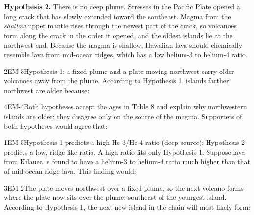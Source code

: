 \documentclass[11pt]{article}
\begin{document}
\textbf{Hypothesis 2.} There is no deep plume. Stresses in the Pacific Plate opened a long crack that has slowly extended toward the southeast. Magma from the \emph{shallow} upper mantle rises through the newest part of the crack, so volcanoes form along the crack in the order it opened, and the oldest islands lie at the northwest end. Because the magma is shallow, Hawaiian lava should chemically resemble lava from mid-ocean ridges, which has a low helium-3 to helium-4 ratio.
\passageend

\begin{q}{2}{EM-3}{Hypothesis 1: a fixed plume and a plate moving northwest carry older volcanoes away from the plume.}
According to Hypothesis 1, islands farther northwest are older because:
\end{q}

\begin{q}{4}{EM-4}{Both hypotheses accept the ages in Table 8 and explain why northwestern islands are older; they disagree only on the source of the magma.}
Supporters of both hypotheses would agree that:
\end{q}

\begin{q}{1}{EM-5}{Hypothesis 1 predicts a high He-3/He-4 ratio (deep source); Hypothesis 2 predicts a low, ridge-like ratio. A high ratio fits only Hypothesis 1.}
Suppose lava from K\={\i}lauea is found to have a helium-3 to helium-4 ratio much higher than that of mid-ocean ridge lava. This finding would:
\end{q}

\begin{q}{3}{EM-2}{The plate moves northwest over a fixed plume, so the next volcano forms where the plate now sits over the plume: southeast of the youngest island.}
According to Hypothesis 1, the next new island in the chain will most likely form:
\end{q}
\end{document}
